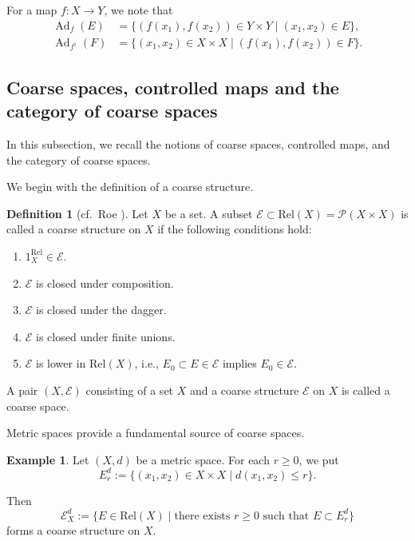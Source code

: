 \documentclass[12pt, a4paper]{amsart}
\theoremstyle{definition}
\newtheorem{definition}[theorem]{Definition}
\newtheorem{example}[theorem]{Example}
\newcommand{\Ad}{\mathop{\mathrm{Ad}}\nolimits}
\newcommand{\Rel}{\mathrm{Rel}}
\begin{document}
For a map $f:X\to Y$, we note that
\begin{align*}
\Ad_f(E)
&=
\{
(f(x_1),f(x_2))
\in
Y\times Y
\mid
(x_1,x_2)\in E
\},
\\
\Ad_{f^\dagger}(F)
&=
\{
(x_1,x_2)
\in
X\times X
\mid
(f(x_1),f(x_2))
\in F
\}.
\end{align*}



\subsection{Coarse spaces, controlled maps and the category of coarse spaces}

In this subsection, we recall the notions of coarse spaces, controlled maps,
and the category of coarse spaces.

We begin with the definition of a coarse structure.

\begin{definition}[cf.~Roe \cite{Roe2003LectureCoarse}]
Let $X$ be a set.
A subset
$\mathcal{E}\subset\Rel(X)=\mathcal{P}(X\times X)$
is called a coarse structure on $X$ if the following conditions hold:
\begin{enumerate}
\item
$1_X^{\Rel}\in\mathcal{E}$.

\item
$\mathcal{E}$ is closed under composition.

\item
$\mathcal{E}$ is closed under the dagger.

\item
$\mathcal{E}$ is closed under finite unions.

\item
$\mathcal{E}$ is lower in $\Rel(X)$, i.e.,
$E_0\subset E\in\mathcal{E}$ implies $E_0\in\mathcal{E}$.
\end{enumerate}

A pair $(X,\mathcal{E})$ consisting of a set $X$ and a coarse structure
$\mathcal{E}$ on $X$ is called a coarse space.
\end{definition}

Metric spaces provide a fundamental source of coarse spaces.

\begin{example}\label{example:metric_coarse}
Let $(X,d)$ be a metric space.
For each $r\ge0$, we put
\[
E_r^d
:=
\{
(x_1,x_2)\in X\times X
\mid
d(x_1,x_2)\le r
\}.
\]

Then
\[
\mathcal{E}_X^d
:=
\{
E\in\Rel(X)
\mid
\text{there exists }r\ge0
\text{ such that }
E\subset E_r^d
\}
\]
forms a coarse structure on $X$.
\end{example}
\end{document}
